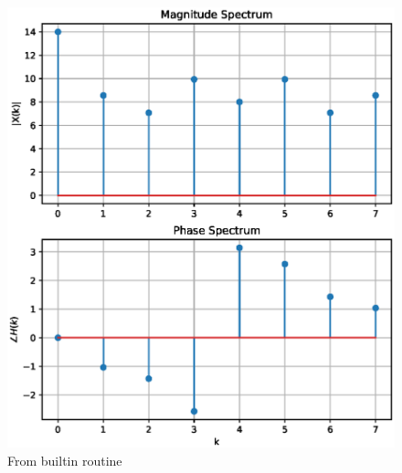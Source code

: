 \documentclass[journal,12pt,twocolumn]{IEEEtran}
\begin{document}
\begin{figure}
    \centering
    \includegraphics[width=\columnwidth]{./figs/dftnumpy.eps}
    \caption{From builtin routine}
    \label{fig:dftnumpy}
\end{figure}
\end{document}
